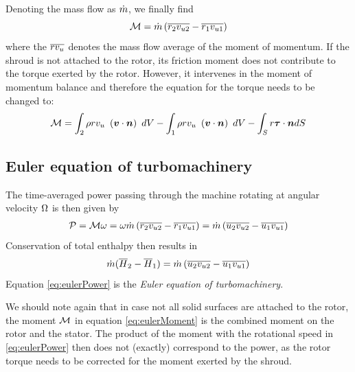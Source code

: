 Denoting the mass flow as $\dot m$, we finally find
\begin{equation}
 \mathcal M = \dot m \left(
   \overline{r_2 v_{u2}} - 
   \overline{r_1 v_{u1}}\right) 
 \label{eq:eulerMoment2}
\end{equation}
where the $\overline{r v_u}$ denotes the mass flow average of
the moment of momentum.  If the shroud is not attached to the rotor,
its friction moment does not contribute to the torque exerted by the
rotor. However, it intervenes in the moment of momentum balance and
therefore the equation for the torque needs to be changed to:
\begin{equation}
  \mathcal M = 
  \int_{2} \rho r v_u ~ \left(\boldsymbol {v} \cdot \boldsymbol {n}\right)~dV - 
  \int_{1} \rho r v_u ~ \left(\boldsymbol {v} \cdot \boldsymbol {n}\right)~dV 
  - \int_{S} r \boldsymbol {\tau} \cdot \boldsymbol {n} dS  
  \label{eq:eulerMoment3}
\end{equation}



\subsection{Euler equation of turbomachinery}

The time-averaged power passing through the
machine rotating at angular velocity $\Omega$ is then given by
\begin{align*}
  \mathcal P = \mathcal M \omega = 
  \omega \dot m \left(
    \overline {r_2 v_{u2}} - 
    \overline {r_1 v_{u1}}
  \right) = 
  \dot m \left(
    \overline{u_2 v_{u2}} - 
    \overline{u_1 v_{u1}}\right)
\end{align*}
Conservation of total enthalpy then results in
\begin{equation}
  \dot m (\overline {H}_2 - \overline {H}_1) = 
  \dot m \left(
    \overline{u_2 v_{u2}} - 
    \overline{u_1 v_{u1}}
  \right)
  \label{eq:eulerPower}
\end{equation}
Equation \ref{eq:eulerPower} is the \emph{Euler equation of
  turbomachinery}.

We should note again that in case not all solid surfaces are attached
to the rotor, the moment $\mathcal M$ in equation \ref{eq:eulerMoment} is
the combined moment on the rotor and the stator. The product of the
moment with the rotational speed in \ref{eq:eulerPower} then does not
(exactly) correspond to the power, as the rotor torque needs to be
corrected for the moment exerted by the shroud.

